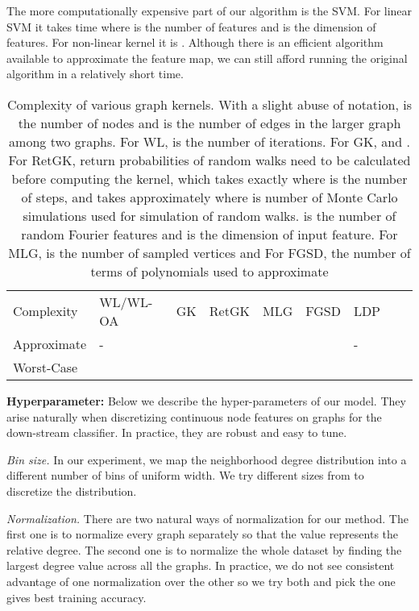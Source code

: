 \documentclass[11pt,onecolumn]{article}
\newcommand{\DOM}       {{LDP}\xspace}
\begin{document}
The more computationally expensive part of our algorithm is the SVM. For linear SVM it takes  time where  is the number of features and  is the dimension of features. For non-linear kernel it is . Although there is an efficient algorithm available to approximate the feature map\cite{rahimi2008random}, we can still afford running the original algorithm in a relatively short time. 
\begin{table}[h]
\label{tab: t1}
\centering
\begin{tabular}{@{}lllllllll@{}}
\toprule
Complexity  
& WL/WL-OA           
& GK                      
& RetGK      
& MLG                       
& FGSD    
& \DOM{} \\
Approximate & -                       &              &                        &                  &                  & -        \\
Worst-Case  &             &                         &                            &         &                   &    \\ \bottomrule
\end{tabular}
\caption{ Complexity of various graph kernels. With a slight abuse of notation,  is the number of nodes and  is the number of edges in the larger graph among two graphs. For WL\cite{shervashidze2011weisfeiler, kriege2016valid},  is the number of iterations. For GK\cite{shervashidze2009efficient},  and .  For RetGK\cite{zhang2018retgk}, return probabilities of random walks need to be calculated before computing the kernel, which takes  exactly where  is the number of steps, and takes  approximately where  is number of Monte Carlo simulations used for simulation of random walks.  is the number of random Fourier features and  is the dimension of input feature. For MLG\cite{kondor2016multiscale},  is the number of sampled vertices and  For FGSD\cite{verma2017hunt},  the number of terms of polynomials used to approximate } 
\end{table}

\textbf{Hyperparameter: }
Below we describe the hyper-parameters of our model. They arise naturally when discretizing continuous node features on graphs for the down-stream classifier. In practice, they are robust and easy to tune. 

\emph{Bin size.}  In our experiment, we map the neighborhood degree distribution into a different number of  bins of uniform width. We try different sizes from  to discretize the distribution.

\emph{Normalization.}  There are two natural ways of normalization for our method. The first one is to normalize every graph separately so that the value represents the relative degree. The second one is to normalize the whole dataset by finding the largest degree value across all the graphs. In practice, we do not see consistent advantage of one normalization over the other so we try both and pick the one gives best training accuracy.
\end{document}
